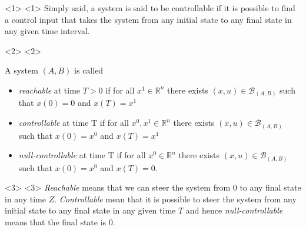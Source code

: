 \begin{frame}

\begin{onlyenv}<1>
<1>
	Simply said, a system is said to be controllable if it is possible to find a control input that takes the system from any initial state to any final state in any given time interval.
\end{onlyenv}

\begin{onlyenv}<2>
<2>
	\begin{mydef}
		A system $(A,B)$ is called
		\begin{itemize}
			\item \emph{reachable} at time $T > 0$ if for all $x^1 \in \mathbb{R}^n$ there exists $(x,u)\in\mathcal{B}_{(A,B)}$ such that $x(0) = 0$ and $x(T) = x^1$
			\item \emph{controllable} at time T if for all $x^0,x^1 \in \mathbb{R}^n$ there exists $(x,u)\in\mathcal{B}_{(A,B)}$ such that $x(0) = x^0$ and $x(T) = x^1$
			\item \emph{null-controllable} at time T if for all $x^0 \in \mathbb{R}^n$ there exists $(x,u)\in\mathcal{B}_{(A,B)}$ such that $x(0) = x^0$ and $x(T) = 0$.
		\end{itemize}
	\end{mydef}
\end{onlyenv}

\begin{onlyenv}<3>
<3>
	\emph{Reachable} means that we can steer the system from 0 to any final state in any time $Z$. \emph{Controllable} mean that it is possible to steer the system from any initial state to any final state in any given time $T$ and hence \emph{null-controllable} means that the final state is 0.
\end{onlyenv}



\end{frame}
